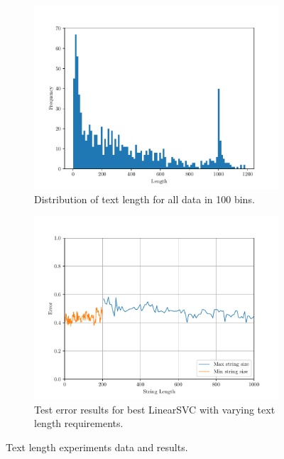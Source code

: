 \begin{figure}[ht]
    \centering
    \begin{subfigure}{0.49\textwidth}
        \includegraphics[width=\textwidth]{../img/plot_string_length_dist_all_data.pdf}
        \caption{Distribution of text length for all data in 100 bins.}
        \label{fig:string_length_dist}
    \end{subfigure}
    \hfill
    \begin{subfigure}{0.49\textwidth}
        \includegraphics[width=\textwidth]{../img/plot_data_length_grid_search.pdf}
        \caption{Test error results for best LinearSVC with varying text length requirements.}
        \label{fig:grid_search_text_length}
    \end{subfigure}
    \caption{Text length experiments data and results.}
\end{figure}

